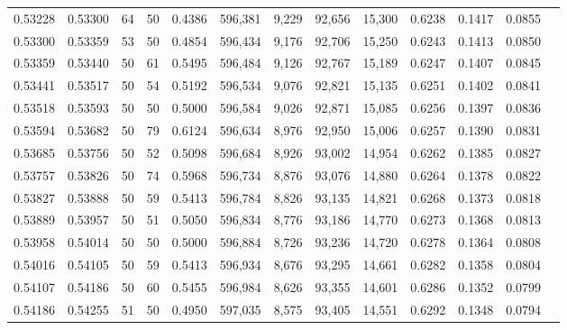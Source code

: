 \begin{tabular}{rrrrrrrrrrrrr}
0.53228 & 0.53300 &    64 &  50 &                                     0.4386 & 596,381 &   9,229 &  92,656 &  15,300 & 0.6238 & 0.1417 & 0.0855 \\
0.53300 & 0.53359 &    53 &  50 &                                     0.4854 & 596,434 &   9,176 &  92,706 &  15,250 & 0.6243 & 0.1413 & 0.0850 \\
0.53359 & 0.53440 &    50 &  61 &                                     0.5495 & 596,484 &   9,126 &  92,767 &  15,189 & 0.6247 & 0.1407 & 0.0845 \\
0.53441 & 0.53517 &    50 &  54 &                                     0.5192 & 596,534 &   9,076 &  92,821 &  15,135 & 0.6251 & 0.1402 & 0.0841 \\
0.53518 & 0.53593 &    50 &  50 &                                     0.5000 & 596,584 &   9,026 &  92,871 &  15,085 & 0.6256 & 0.1397 & 0.0836 \\
0.53594 & 0.53682 &    50 &  79 &                                     0.6124 & 596,634 &   8,976 &  92,950 &  15,006 & 0.6257 & 0.1390 & 0.0831 \\
0.53685 & 0.53756 &    50 &  52 &                                     0.5098 & 596,684 &   8,926 &  93,002 &  14,954 & 0.6262 & 0.1385 & 0.0827 \\
0.53757 & 0.53826 &    50 &  74 &                                     0.5968 & 596,734 &   8,876 &  93,076 &  14,880 & 0.6264 & 0.1378 & 0.0822 \\
0.53827 & 0.53888 &    50 &  59 &                                     0.5413 & 596,784 &   8,826 &  93,135 &  14,821 & 0.6268 & 0.1373 & 0.0818 \\
0.53889 & 0.53957 &    50 &  51 &                                     0.5050 & 596,834 &   8,776 &  93,186 &  14,770 & 0.6273 & 0.1368 & 0.0813 \\
0.53958 & 0.54014 &    50 &  50 &                                     0.5000 & 596,884 &   8,726 &  93,236 &  14,720 & 0.6278 & 0.1364 & 0.0808 \\
0.54016 & 0.54105 &    50 &  59 &                                     0.5413 & 596,934 &   8,676 &  93,295 &  14,661 & 0.6282 & 0.1358 & 0.0804 \\
0.54107 & 0.54186 &    50 &  60 &                                     0.5455 & 596,984 &   8,626 &  93,355 &  14,601 & 0.6286 & 0.1352 & 0.0799 \\
0.54186 & 0.54255 &    51 &  50 &                                     0.4950 & 597,035 &   8,575 &  93,405 &  14,551 & 0.6292 & 0.1348 & 0.0794 \\

\end{tabular}
